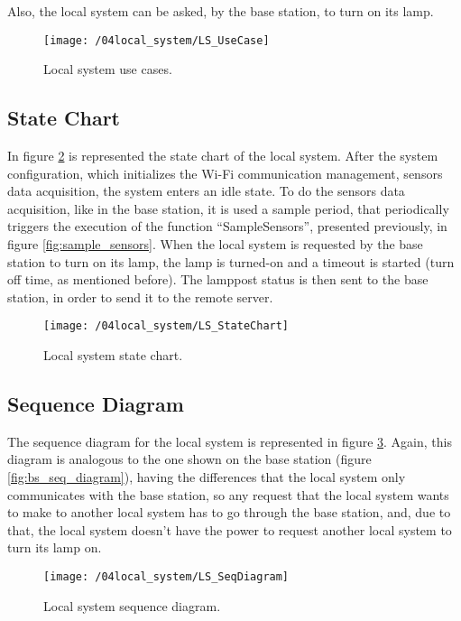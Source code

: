 Also, the local system can be asked, by the base station, to turn on its lamp.
\clearpage

\begin{figure}[ht]
	\centering
	\texttt{[image: /04local\_system/LS\_UseCase]}
	\caption{Local system use cases.}
	\label{fig:ls_use_cases}
\end{figure}

\subsection{State Chart}
In figure \ref{fig:ls_state_chart} is represented the state chart of the local system. After the system configuration, which initializes the Wi-Fi communication management, sensors data acquisition, the system enters an idle state. To do the sensors data acquisition, like in the base station, it is used a sample period, that periodically triggers the execution of the function “SampleSensors”, presented previously, in figure \ref{fig:sample_sensors}. When the local system is requested by the base station to turn on its lamp, the lamp is turned-on and a timeout is started (turn off time, as mentioned before). The lamppost status is then sent to the base station, in order to send it to the remote server.

\begin{figure}[ht]
	\centering
	\texttt{[image: /04local\_system/LS\_StateChart]}
	\caption{Local system state chart.}
	\label{fig:ls_state_chart}
\end{figure}

\clearpage
\subsection{Sequence Diagram}
The sequence diagram for the local system is represented in figure \ref{fig:ls_seq_diagram}. Again, this diagram is analogous to the one shown on the base station (figure \ref{fig:bs_seq_diagram}), having the differences that the local system only communicates with the base station, so any request that the local system wants to make to another local system has to go through the base station, and, due to that, the local system doesn't have the power to request another local system to turn its lamp on.

\begin{figure}[ht]
	\centering
	\texttt{[image: /04local\_system/LS\_SeqDiagram]}
	\caption{Local system sequence diagram.}
	\label{fig:ls_seq_diagram}
\end{figure}
